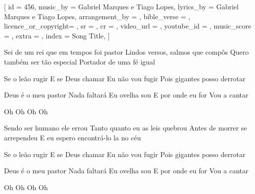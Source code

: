 [
    id                  = {456},
    music_by            = {Gabriel Marques e Tiago Lopes}, %
    lyrics_by           = {Gabriel Marques e Tiago Lopes}, %
    arrangement_by      = {}, %
    bible_verse         = {},
    licence_or_copyright= {},
    sr                  = {},
    cr                  = {},
    video_url           = {}, %
    youtube_id          = {}, %
    music_score         = {}, %
    extra               = {},
    index               = {Song Title},
]

\beginverse
Sei de um rei que em tempos foi pastor
Lindos versos, salmos que compôs 
Quero também ser tão especial
Portador de uma fé igual
\endverse

\beginchorus
Se o leão rugir
E se Deus chamar
Eu não vou fugir
Pois gigantes posso derrotar

Deus é o meu pastor
Nada faltará 
Eu ovelha sou
E por onde eu for
Vou a cantar

Oh 
Oh
Oh
Oh
\endchorus

\beginverse
Sendo ser humano ele errou
Tanto quanto eu as leis quebrou
Antes de morrer se arrependeu
E eu espero encontrá-lo la no céu
\endverse

\beginchorus
Se o leão rugir
E se Deus chamar
Eu não vou fugir
Pois gigantes posso derrotar

Deus é o meu pastor
Nada faltará 
Eu ovelha sou
E por onde eu for
Vou a cantar

Oh 
Oh
Oh
Oh
\endchorus

\endsong
